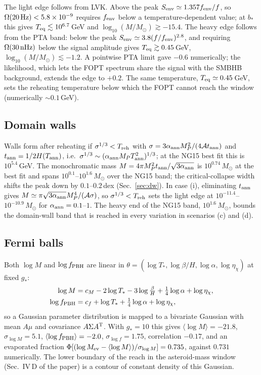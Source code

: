 \documentclass[aps,prd,onecolumn,superscriptaddress,nofootinbib,floatfix]{revtex4-2}
\newcommand{\fpbh}{f_{\rm PBH}}
\newcommand{\Msun}{M_\odot}
\newcommand{\Treh}{T_{\rm reh}}
\begin{document}
The light edge follows from LVK. Above the peak $S_{\rm env}\simeq1.357f_{\rm env}/f$, so $\Omega(20\,{\rm Hz})<5.8\times10^{-9}$ requires $f_{\rm env}$ below a temperature-dependent value; at $b_\ast$ this gives $T_{\rm eq}\lesssim10^{6.7}$\,GeV and $\log_{10}(M/\Msun)\gtrsim-15.4$. The heavy edge follows from the PTA band: below the peak $S_{\rm env}\simeq3.8(f/f_{\rm env})^{2.8}$, and requiring $\Omega(30\,{\rm nHz})$ below the signal amplitude gives $T_{\rm eq}\gtrsim0.45$\,GeV, $\log_{10}(M/\Msun)\lesssim-1.2$. A pointwise PTA limit gave $-0.6$ numerically; the likelihood, which lets the FOPT spectrum share the signal with the SMBHB background, extends the edge to $+0.2$. The same temperature, $T_{\rm eq}\simeq0.45$\,GeV, sets the reheating temperature below which the FOPT cannot reach the window (numerically $\sim0.1$\,GeV).

\subsection{Domain walls}

Walls form after reheating if $\sigma^{1/3}<\Treh$ with $\sigma=3\alpha_{\rm ann}M_P^2/(4\mathcal{A}t_{\rm ann})$ and $t_{\rm ann}=1/2H(T_{\rm ann})$, i.e.\ $\sigma^{1/3}\sim(\alpha_{\rm ann}M_PT_{\rm ann}^2)^{1/3}$; at the NG15 best fit this is $10^{5.4}$\,GeV. The monochromatic mass $M=4\pi M_P^2t_{\rm ann}/\sqrt{3\alpha_{\rm ann}}$ is $10^{0.74}\,\Msun$ at the best fit and spans $10^{0.1}$--$10^{1.6}\,\Msun$ over the NG15 band; the critical-collapse width shifts the peak down by $0.1$--$0.2$\,dex (Sec.~\ref{sec:dw}). In case (i), eliminating $t_{\rm ann}$ gives $M\simeq\pi\sqrt{3\alpha_{\rm ann}}M_P^4/(\mathcal{A}\sigma)$, so $\sigma^{1/3}<\Treh$ sets the light edge at $10^{-11.4}$--$10^{-10.9}\,\Msun$ for $\alpha_{\rm ann}=0.1$--$1$. The heavy end of the NG15 band, $10^{1.6}\,\Msun$, bounds the domain-wall band that is reached in every variation in scenarios (c) and (d).

\subsection{Fermi balls}

Both $\log M$ and $\log\fpbh$ are linear in $\theta=(\log T_\ast,\log\beta/H,\log\alpha,\log\eta_\chi)$ at fixed $g_\ast$:
\begin{align}
\log M&=c_M-2\log T_\ast-3\log\tfrac{\beta}{H}+\tfrac14\log\alpha+\log\eta_\chi,\\
\log\fpbh&=c_f+\log T_\ast+\tfrac14\log\alpha+\log\eta_\chi,
\end{align}
so a Gaussian parameter distribution is mapped to a bivariate Gaussian with mean $A\mu$ and covariance $A\Sigma A^{\rm T}$. With $g_\ast=10$ this gives $\langle\log M\rangle=-21.8$, $\sigma_{\log M}=5.1$, $\langle\log\fpbh\rangle=-2.0$, $\sigma_{\log f}=1.75$, correlation $-0.17$, and an evaporated fraction $\Phi[(\log M_{\rm ev}-\langle\log M\rangle)/\sigma_{\log M}]=0.735$, against $0.731$ numerically. The lower boundary of the reach in the asteroid-mass window (Sec.~IV\,D of the paper) is a contour of constant density of this Gaussian.
\end{document}
